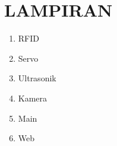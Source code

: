 \chapter*{LAMPIRAN}

\begin{enumerate}[topsep=0pt,itemsep=0pt,partopsep=0pt, parsep=0pt]
    \item RFID
    

    \item Servo
    

    \item Ultrasonik
    

    \item Kamera
    

    \item Main
    

    \item Web
    

\end{enumerate}